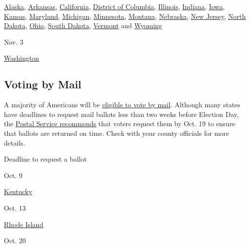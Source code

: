 \href{https://www.elections.alaska.gov/Core/absenteeearlyandinpersonvoting.php}{Alaska},
\href{https://www.sos.arkansas.gov/elections}{Arkansas},
\href{https://www.sos.ca.gov/elections}{California},
\href{https://earlyvoting.dcboe.org/}{District of Columbia},
\href{https://www.elections.il.gov/}{Illinois},
\href{https://www.in.gov/sos/elections/}{Indiana},
\href{https://sos.iowa.gov/elections/voterinformation/index.html}{Iowa},
\href{https://sos.ks.gov/elections/elections.html}{Kansas},
\href{https://elections.maryland.gov/voting/index.html}{Maryland},
\href{https://www.michigan.gov/sos/0,4670,7-127-1633---,00.html}{Michigan},
\href{https://www.sos.state.mn.us/elections-voting/}{Minnesota},
\href{https://sosmt.gov/elections/}{Montana},
\href{https://www.nebraska.gov/featured/elections-voting/}{Nebraska},
\href{https://www.state.nj.us/state/elections/index.shtml}{New Jersey},
\href{https://vip.sos.nd.gov/PortalList.aspx}{North Dakota},
\href{https://www.ohiosos.gov/elections/}{Ohio},
\href{https://sdsos.gov/elections-voting/default.aspx}{South Dakota},
\href{https://sos.vermont.gov/elections/}{Vermont} and
\href{https://soswy.state.wy.us/elections}{Wyoming}

Nov. 3

\href{https://www.sos.wa.gov/elections/}{Washington}

\hypertarget{voting-by-mail}{%
\subsection{Voting by Mail}\label{voting-by-mail}}

A majority of Americans will be
\href{https://www.nytimes3xbfgragh.onion/interactive/2020/08/11/us/politics/vote-by-mail-us-states.html}{eligible
to vote by mail}. Although many states have deadlines to request mail
ballots less than two weeks before Election Day, the
\href{https://about.usps.com/who/legal/foia/documents/election-mail/election-mail-2020-pages-26-51.pdf}{Postal
Service recommends} that voters request them by Oct. 19 to ensure that
ballots are returned on time. Check with your county officials for more
details.

Deadline to request a ballot

Oct. 9

\href{https://elect.ky.gov/Pages/default.aspx}{Kentucky}

Oct. 13

\href{https://vote.sos.ri.gov/}{Rhode Island}

Oct. 20

